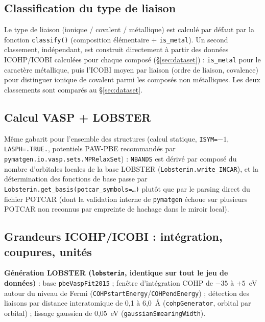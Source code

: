\documentclass[11pt,a4paper]{article}
\begin{document}
\subsection{Classification du type de liaison}

Le type de liaison (ionique / covalent / métallique) est calculé par
défaut par la fonction \texttt{classify()} (composition élémentaire +
\texttt{is\_metal}). Un second classement, indépendant, est construit
directement à partir des données ICOHP/ICOBI calculées pour chaque
composé (\S\ref{sec:dataset}) : \texttt{is\_metal} pour le caractère
métallique, puis l'ICOBI moyen par liaison (ordre de liaison,
covalence) pour distinguer ionique de covalent parmi les composés non
métalliques. Les deux classements sont comparés au
\S\ref{sec:dataset}.

\subsection{Calcul VASP + LOBSTER}

Même gabarit pour l'ensemble des structures (calcul statique,
\texttt{ISYM=$-1$}, \texttt{LASPH=.TRUE.}, potentiels PAW-PBE recommandés
par \texttt{pymatgen.io.vasp.sets.MPRelaxSet}) : \texttt{NBANDS} est
dérivé par composé du nombre d'orbitales locales de la base LOBSTER
(\texttt{Lobsterin.write\_INCAR}), et la détermination des fonctions de
base passe par \texttt{Lobsterin.get\_basis(potcar\_symbols=\ldots)}
plutôt que par le parsing direct du fichier POTCAR (dont la validation
interne de \texttt{pymatgen} échoue sur plusieurs POTCAR non reconnus par
empreinte de hachage dans le miroir local).

\subsection{Grandeurs ICOHP/ICOBI : intégration, coupures, unités}
\label{sec:icohp-methodo}

\textbf{Génération LOBSTER (\texttt{lobsterin}, identique sur tout le
jeu de données)} : base \texttt{pbeVaspFit2015} ; fenêtre d'intégration
COHP de $-35$ à $+5$~eV autour du niveau de Fermi
(\texttt{COHPstartEnergy}/\texttt{COHPendEnergy}) ; détection des
liaisons par distance interatomique de 0,1 à 6,0~\AA{}
(\texttt{cohpGenerator}, orbital par orbital) ; lissage gaussien de
0,05~eV (\texttt{gaussianSmearingWidth}).
\end{document}
